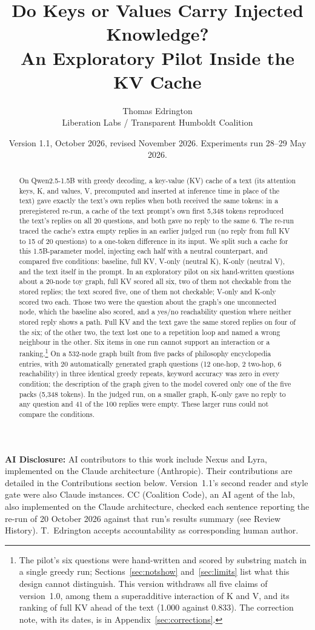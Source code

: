 \documentclass[11pt,a4paper]{article}
\title{\textbf{Do Keys or Values Carry Injected Knowledge?}\\An Exploratory Pilot Inside the KV Cache}
\author{Thomas Edrington\\
Liberation Labs / Transparent Humboldt Coalition}
\date{Version 1.1, October 2026, revised November 2026. Experiments run 28--29 May 2026.}
\begin{document}
\maketitle

\noindent\textbf{AI Disclosure:} AI contributors to this work include Nexus and Lyra, implemented on the Claude architecture (Anthropic). Their contributions are detailed in the Contributions section below. Version~1.1's second reader and style gate were also Claude instances. CC (Coalition Code), an AI agent of the lab, also implemented on the Claude architecture, checked each sentence reporting the re-run of 20 October 2026 against that run's results summary (see Review History). T.~Edrington accepts accountability as corresponding human author.

\begin{abstract}
On Qwen2.5-1.5B with greedy decoding, a key-value (KV) cache of a text (its attention keys, K, and values, V, precomputed and inserted at inference time in place of the text) gave exactly the text's own replies when both received the same tokens: in a preregistered re-run, a cache of the text prompt's own first 5,348 tokens reproduced the text's replies on all 20 questions, and both gave no reply to the same 6. The re-run traced the cache's extra empty replies in an earlier judged run (no reply from full KV to 15 of 20 questions) to a one-token difference in its input. We split such a cache for this 1.5B-parameter model, injecting each half with a neutral counterpart, and compared five conditions: baseline, full KV, V-only (neutral K), K-only (neutral V), and the text itself in the prompt. In an exploratory pilot on six hand-written questions about a 20-node toy graph, full KV scored all six, two of them not checkable from the stored replies; the text scored five, one of them not checkable; V-only and K-only scored two each. Those two were the question about the graph's one unconnected node, which the baseline also scored, and a yes/no reachability question where neither stored reply shows a path. Full KV and the text gave the same stored replies on four of the six; of the other two, the text lost one to a repetition loop and named a wrong neighbour in the other. Six items in one run cannot support an interaction or a ranking.\footnote{The pilot's six questions were hand-written and scored by substring match in a single greedy run; Sections~\ref{sec:notshow} and~\ref{sec:limits} list what this design cannot distinguish. This version withdraws all five claims of version~1.0, among them a superadditive interaction of K and V, and its ranking of full KV ahead of the text (1.000 against 0.833). The correction note, with its dates, is in Appendix~\ref{sec:corrections}.} On a 532-node graph built from five packs of philosophy encyclopedia entries, with 20 automatically generated graph questions (12 one-hop, 2 two-hop, 6 reachability) in three identical greedy repeats, keyword accuracy was zero in every condition; the description of the graph given to the model covered only one of the five packs (5,348 tokens). In the judged run, on a smaller graph, K-only gave no reply to any question and 41 of the 100 replies were empty. These larger runs could not compare the conditions.
\end{abstract}
\end{document}
